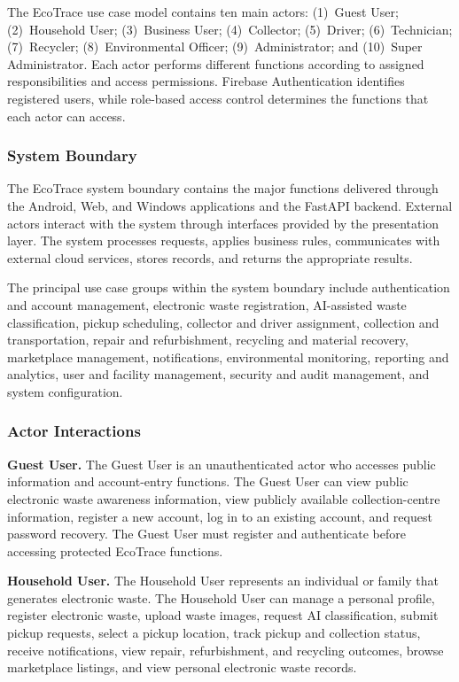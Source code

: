 The EcoTrace use case model contains ten main actors: (1)~Guest User;
(2)~Household User; (3)~Business User; (4)~Collector; (5)~Driver;
(6)~Technician; (7)~Recycler; (8)~Environmental Officer; (9)~Administrator;
and (10)~Super Administrator. Each actor performs different functions
according to assigned responsibilities and access permissions. Firebase
Authentication identifies registered users, while role-based access control
determines the functions that each actor can access.

\subsubsection{System Boundary}

The EcoTrace system boundary contains the major functions delivered
through the Android, Web, and Windows applications and the FastAPI backend.
External actors interact with the system through interfaces provided by the
presentation layer. The system processes requests, applies business rules,
communicates with external cloud services, stores records, and returns the
appropriate results.

The principal use case groups within the system boundary include
authentication and account management, electronic waste registration,
AI-assisted waste classification, pickup scheduling, collector and driver
assignment, collection and transportation, repair and refurbishment, recycling
and material recovery, marketplace management, notifications, environmental
monitoring, reporting and analytics, user and facility management, security
and audit management, and system configuration.

\subsubsection{Actor Interactions}

\textbf{Guest User.} The Guest User is an unauthenticated actor who accesses
public information and account-entry functions. The Guest User can view
public electronic waste awareness information, view publicly available
collection-centre information, register a new account, log in to an existing
account, and request password recovery. The Guest User must register and
authenticate before accessing protected EcoTrace functions.

\textbf{Household User.} The Household User represents an individual or
family that generates electronic waste. The Household User can manage a
personal profile, register electronic waste, upload waste images, request AI
classification, submit pickup requests, select a pickup location, track pickup
and collection status, receive notifications, view repair, refurbishment, and
recycling outcomes, browse marketplace listings, and view personal electronic
waste records.

